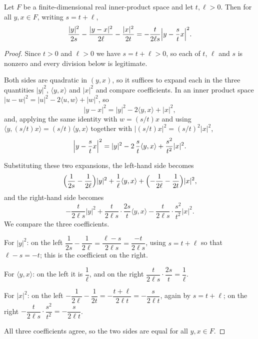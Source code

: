 \begin{lemma}
Let $F$ be a finite-dimensional real inner-product space and let $t,\ell>0$. Then for all
$y,x\in F$, writing $s=t+\ell$,
\[
  \frac{|y|^2}{2s}-\frac{|y-x|^2}{2\ell}-\frac{|x|^2}{2t}
    =-\frac{t}{2\ell s}\Bigl|y-\frac stx\Bigr|^2 .
\]
\end{lemma}
\begin{proof}
Since $t>0$ and $\ell>0$ we have $s=t+\ell>0$, so each of $t$, $\ell$ and $s$ is nonzero
and every division below is legitimate.

Both sides are quadratic in $(y,x)$, so it suffices to expand each in the three
quantities $|y|^2$, $\langle y,x\rangle$ and $|x|^2$ and compare coefficients. In an inner
product space $|u-w|^2=|u|^2-2\langle u,w\rangle+|w|^2$, so
\[
  |y-x|^2=|y|^2-2\langle y,x\rangle+|x|^2,
\]
and, applying the same identity with $w=(s/t)x$ and using
$\langle y,(s/t)x\rangle=(s/t)\langle y,x\rangle$ together with
$|(s/t)x|^2=(s/t)^2|x|^2$,
\[
  \Bigl|y-\frac stx\Bigr|^2
   =|y|^2-2\,\frac st\langle y,x\rangle+\frac{s^2}{t^2}|x|^2 .
\]

Substituting these two expansions, the left-hand side becomes
\[
  \Bigl(\frac1{2s}-\frac1{2\ell}\Bigr)|y|^2
   +\frac1\ell\langle y,x\rangle
   +\Bigl(-\frac1{2\ell}-\frac1{2t}\Bigr)|x|^2 ,
\]
and the right-hand side becomes
\[
  -\frac{t}{2\ell s}|y|^2
   +\frac{t}{2\ell s}\cdot\frac{2s}{t}\langle y,x\rangle
   -\frac{t}{2\ell s}\cdot\frac{s^2}{t^2}|x|^2 .
\]
We compare the three coefficients.

For $|y|^2$: on the left $\dfrac1{2s}-\dfrac1{2\ell}=\dfrac{\ell-s}{2\ell s}
=\dfrac{-t}{2\ell s}$, using $s=t+\ell$ so that $\ell-s=-t$; this is the coefficient on
the right.

For $\langle y,x\rangle$: on the left it is $\dfrac1\ell$, and on the right
$\dfrac{t}{2\ell s}\cdot\dfrac{2s}{t}=\dfrac1\ell$.

For $|x|^2$: on the left
$-\dfrac1{2\ell}-\dfrac1{2t}=-\dfrac{t+\ell}{2\ell t}=-\dfrac{s}{2\ell t}$, again by
$s=t+\ell$; on the right
$-\dfrac{t}{2\ell s}\cdot\dfrac{s^2}{t^2}=-\dfrac{s}{2\ell t}$.

All three coefficients agree, so the two sides are equal for all $y,x\in F$.
\end{proof}
